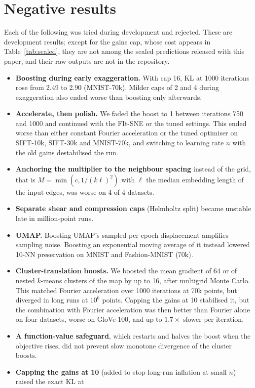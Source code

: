\documentclass[11pt]{article}
\begin{document}
\section{Negative results}\label{app:negative}
Each of the following was tried during development and rejected. These are development results; except for the
gains cap, whose cost appears in Table~\ref{tab:sealed}, they are not among the sealed predictions released with this
paper, and their raw outputs are not in the repository.
\begin{itemize}
\item \textbf{Boosting during early exaggeration.} With cap 16, KL at 1000 iterations rose from 2.49 to 2.90
(MNIST-70k). Milder caps of 2 and 4 during exaggeration also ended worse than boosting only afterwards.
\item \textbf{Accelerate, then polish.} We faded the boost to 1 between iterations 750 and 1000 and continued
with the FIt-SNE or the tuned settings. This ended worse than either constant Fourier acceleration or the
tuned optimiser on SIFT-10k, SIFT-30k and MNIST-70k, and switching to learning rate $n$ with the old gains
destabilised the run.
\item \textbf{Anchoring the multiplier to the neighbour spacing} instead of the grid, that is
$M=\min(c,1/(k\ell)^2)$ with $\ell$ the median embedding length of the input edges, was worse on 4 of 4
datasets.
\item \textbf{Separate shear and compression caps} (Helmholtz split) became unstable late in million-point runs.
\item \textbf{UMAP.} Boosting UMAP's sampled per-epoch displacement amplifies sampling noise. Boosting an
exponential moving average of it instead lowered 10-NN preservation on MNIST and Fashion-MNIST (70k).
\item \textbf{Cluster-translation boosts.} We boosted the mean gradient of 64 or of nested $k$-means clusters
of the map by up to 16, after multigrid Monte Carlo. This matched Fourier acceleration over 1000 iterations at
70k points, but diverged in long runs at $10^6$ points. Capping the gains at 10 stabilised it, but the
combination with Fourier acceleration was then better than Fourier alone on four datasets, worse on
GloVe-100, and up to $1.7\times$ slower per iteration.
\item \textbf{A function-value safeguard}, which restarts and halves the boost when the objective rises, did
not prevent slow monotone divergence of the cluster boosts.
\item \textbf{Capping the gains at 10} (added to stop long-run inflation at small $n$) raised the exact KL at

\end{itemize}
\end{document}
